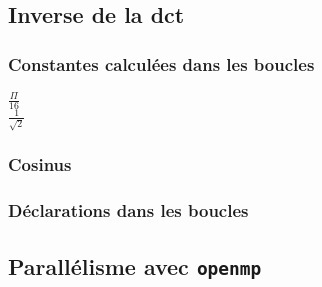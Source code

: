 \documentclass[a4paper, 11pt]{article}
\begin{document}
	\subsection{Inverse de la dct}
	\subsubsection{Constantes calculées dans les boucles}
	\begin{description}
		\item[$\frac{\Pi}{16}$]
		\item[$\frac{1}{\sqrt{2}}$]
	\end{description}
	\subsubsection{Cosinus}
	\subsubsection{Déclarations dans les boucles}
	\subsection{Parallélisme avec \texttt{openmp}}
	\appendix
	\listoffigures
	\lstlistoflistings
\end{document}
